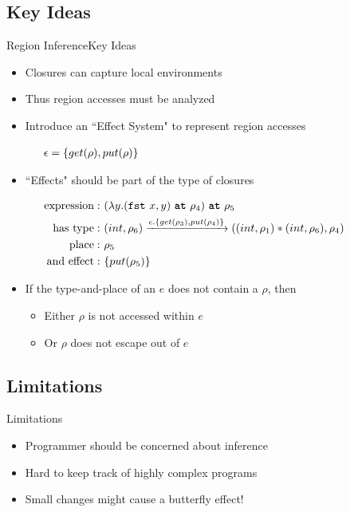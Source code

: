 \documentclass[xcolor=x11names,compress]{beamer}
\newcommand{\ttbf}[1] {\texttt{\textbf{#1}}}
\newenvironment{smashedalign}
               {\vspace{1mm}\small\par$\!\aligned\hspace{1.6em}}
               {\endaligned$\par\vspace{1mm}}
\renewcommand{\(}{\begin{columns}}
\renewcommand{\)}{\end{columns}}
\newcommand{\<}[1]{\begin{column}{#1}}
\renewcommand{\>}{\end{column}}
\begin{document}
\subsection{Key Ideas}
\begin{frame}{Region Inference}{Key Ideas}
    \begin{itemize}
        \item Closures can capture local environments
        \pause
        \item Thus region accesses must be analyzed
        \pause
        \item Introduce an ``Effect System" to represent region accesses
        \begin{smashedalign}
        \epsilon = \{ get(\rho), put(\rho) \}
        \end{smashedalign}
        \pause
        \item ``Effects" should be part of the type of closures
        \begin{smashedalign}
            {\rm expression:}&~(\lambda y.(\mathtt{fst~} x, y) ~\ttbf{at}~ \rho_4) ~\ttbf{at}~ \rho_5
            \\
            {\rm has~type:}&~ (int, \rho_6) \xrightarrow{\epsilon.\{get(\rho_3), put(\rho_4)\}} ((int, \rho_1)*(int, \rho_6), \rho_4)
            \\
            {\rm place:}&~ \rho_5
            \\
            {\rm and~effect:}&~ \{put(\rho_5)\}
        \end{smashedalign}
        \pause
        \item If the type-and-place of an $e$ does not contain a $\rho$, then
        \pause
        \begin{itemize}
            \item Either $\rho$ is not accessed within $e$
            \pause
            \item Or $\rho$ does not escape out of $e$
        \end{itemize}
    \end{itemize}
\end{frame}

\subsection{Limitations}
\begin{frame}{Limitations}
    \begin{itemize}
        \item Programmer should be concerned about inference
        \item Hard to keep track of highly complex programs
        \item Small changes might cause a butterfly effect!
    \end{itemize}
\end{frame}
\end{document}

